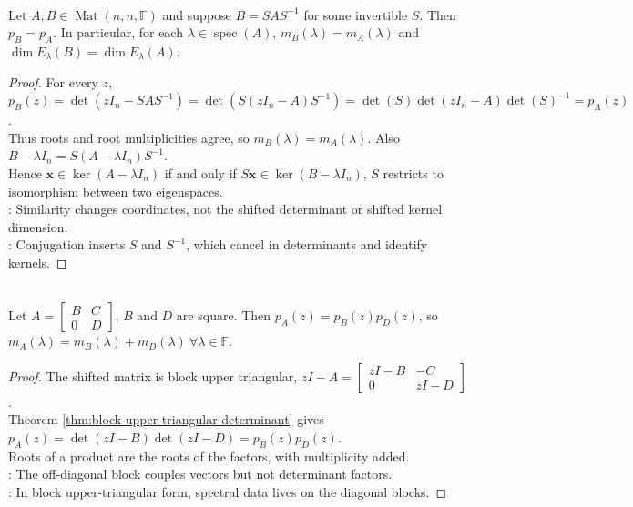\begin{theorem} \label{thm:similarity-preserves-characteristic-polynomial} \\
Let $A,B\in\operatorname{Mat}(n,n,\mathbb{F})$ and suppose $B=SAS^{-1}$ for some invertible $S$. Then $p_B=p_A$. In particular, for each $\lambda\in\operatorname{spec}(A)$, $m_B(\lambda)=m_A(\lambda)$ and $\dim E_{\lambda}(B)=\dim E_{\lambda}(A)$.
\begin{proof}
For every $z$, $p_B(z) =\det(zI_n-SAS^{-1}) =\det(S(zI_n-A)S^{-1}) =\det(S)\det(zI_n-A)\det(S)^{-1} =p_A(z)$.\\
Thus roots and root multiplicities agree, so $m_B(\lambda)=m_A(\lambda)$. Also $B-\lambda I_n=S(A-\lambda I_n)S^{-1}$.\\
Hence $\mathbf{x}\in\ker(A-\lambda I_n)$ if and only if $S\mathbf{x}\in\ker(B-\lambda I_n)$, $S$ restricts to isomorphism between two eigenspaces.\\
: Similarity changes coordinates, not the shifted determinant or shifted kernel dimension.\\
: Conjugation inserts $S$ and $S^{-1}$, which cancel in determinants and identify kernels.
\end{proof}
\end{theorem}

\begin{proposition} \label{prop:block-upper-triangular-characteristic-polynomial} \\
Let $A=
\begin{bmatrix}
B & C\\
0 & D
\end{bmatrix}$, $B$ and $D$ are square. Then $p_A(z)=p_B(z)p_D(z)$, so $m_A(\lambda)=m_B(\lambda)+m_D(\lambda) \ \forall\lambda\in\mathbb{F}$.
\begin{proof}
The shifted matrix is block upper triangular, $zI-A=
\begin{bmatrix}
zI-B & -C\\
0 & zI-D \end{bmatrix}$.\\
Theorem \ref{thm:block-upper-triangular-determinant} gives $p_A(z)=\det(zI-B)\det(zI-D)=p_B(z)p_D(z)$.\\
Roots of a product are the roots of the factors, with multiplicity added.\\
: The off-diagonal block couples vectors but not determinant factors.\\
: In block upper-triangular form, spectral data lives on the diagonal blocks.
\end{proof}
\end{proposition}

